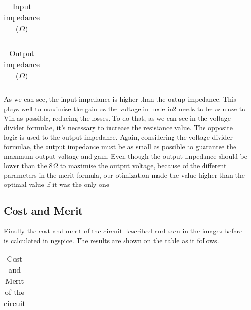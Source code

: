 \begin{table}[H]
  \centering
  \begin{tabular}{|l|r|}
    \hline    
   
   \end{tabular}
  \caption{Input impedance ($\Omega$)}
    \label{tab:ZI}
\end{table}

\begin{table}[H]
  \centering
  \begin{tabular}{|l|r|}
    \hline    
   
   \end{tabular}
  \caption{Output impedance ($\Omega$)}
  
  \label{tab:ZO}
\end{table}

\par As we can see, the input impedance is higher than the outup impedance. This plays well to maximise the gain as the voltage in node in2 needs to be as close to Vin as possible, reducing the losses. To do that, as we can see in the voltage divider formulae, it's necessary to increase the resistance value. The opposite logic is used to the output impedance. Again, considering the voltage divider formulae, the output impedance must be as small as possible to guarantee the maximum output voltage and gain. Even though the output impedance should be lower than the $8\Omega$ to maximise the output voltage, because of the different parameters in the merit formula, our otimization made the value higher than the optimal value if it was the only one. 

\subsection {Cost and Merit}
\par Finally the cost and merit of the circuit described and seen in the images before  is calculated in ngspice. The results are shown on the table as it follows.

\begin{table}[H]
  \centering
  \begin{tabular}{|l|r|}
    \hline    
   
   \end{tabular}
  \caption{Cost and Merit of the circuit}
  \label{tab:cost}
\end{table}
\newpage
